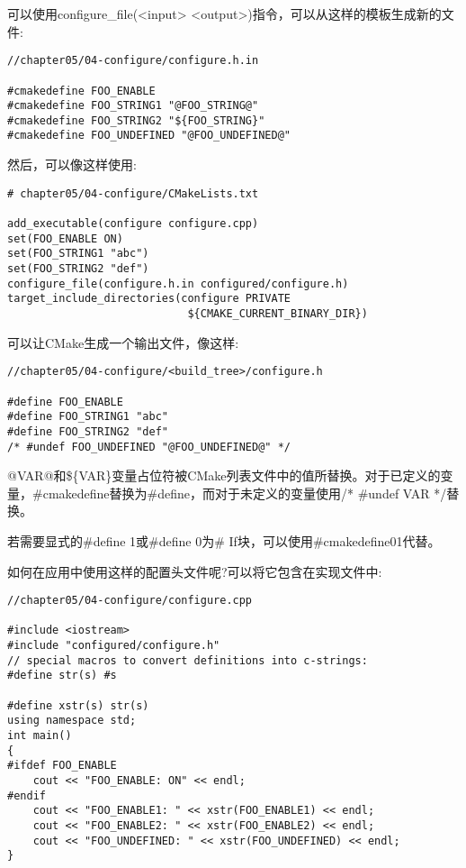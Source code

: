 可以使用configure\_file(<input> <output>)指令，可以从这样的模板生成新的文件:

\begin{lstlisting}[style=styleCXX]
//chapter05/04-configure/configure.h.in

#cmakedefine FOO_ENABLE
#cmakedefine FOO_STRING1 "@FOO_STRING@"
#cmakedefine FOO_STRING2 "${FOO_STRING}"
#cmakedefine FOO_UNDEFINED "@FOO_UNDEFINED@"
\end{lstlisting}  

然后，可以像这样使用:

\begin{lstlisting}[style=styleCMake]
# chapter05/04-configure/CMakeLists.txt

add_executable(configure configure.cpp)
set(FOO_ENABLE ON)
set(FOO_STRING1 "abc")
set(FOO_STRING2 "def")
configure_file(configure.h.in configured/configure.h)
target_include_directories(configure PRIVATE
							${CMAKE_CURRENT_BINARY_DIR})
\end{lstlisting}  

可以让CMake生成一个输出文件，像这样:

\begin{lstlisting}[style=styleCXX]
//chapter05/04-configure/<build_tree>/configure.h
	
#define FOO_ENABLE
#define FOO_STRING1 "abc"
#define FOO_STRING2 "def"
/* #undef FOO_UNDEFINED "@FOO_UNDEFINED@" */
\end{lstlisting}  

@VAR@和\$\{VAR\}变量占位符被CMake列表文件中的值所替换。对于已定义的变量，\#cmakedefine替换为\#define，而对于未定义的变量使用/* \#undef VAR */替换。

若需要显式的\#define 1或\#define 0为\# If块，可以使用\#cmakedefine01代替。

如何在应用中使用这样的配置头文件呢?可以将它包含在实现文件中:

\begin{lstlisting}[style=styleCXX]
//chapter05/04-configure/configure.cpp

#include <iostream>
#include "configured/configure.h"
// special macros to convert definitions into c-strings:
#define str(s) #s

#define xstr(s) str(s)
using namespace std;
int main()
{
#ifdef FOO_ENABLE
	cout << "FOO_ENABLE: ON" << endl;
#endif
	cout << "FOO_ENABLE1: " << xstr(FOO_ENABLE1) << endl;
	cout << "FOO_ENABLE2: " << xstr(FOO_ENABLE2) << endl;
	cout << "FOO_UNDEFINED: " << xstr(FOO_UNDEFINED) << endl;
}
\end{lstlisting}

